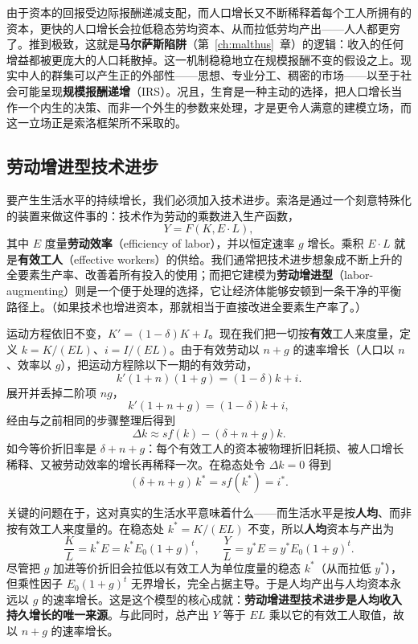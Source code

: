 \begin{remark}
由于资本的回报受边际报酬递减支配，而人口增长又不断稀释着每个工人所拥有的资本，更快的人口增长会拉低稳态劳均资本、从而拉低劳均产出——人人都更穷了。推到极致，这就是\textbf{马尔萨斯陷阱}（第~\ref{ch:malthus}~章）的逻辑：收入的任何增益都被更庞大的人口耗散掉。这一机制稳稳地立在规模报酬不变的假设之上。现实中人的群集可以产生正的外部性——思想、专业分工、稠密的市场——以至于社会可能呈现\textbf{规模报酬递增}（IRS）。况且，生育是一种主动的选择，把人口增长当作一个内生的决策、而非一个外生的参数来处理，才是更令人满意的建模立场，而这一立场正是索洛框架所不采取的。
\end{remark}

\subsection{劳动增进型技术进步}

要产生生活水平的持续增长，我们必须加入技术进步。索洛是通过一个刻意特殊化的装置来做这件事的：技术作为劳动的乘数进入生产函数，
\[
Y = F(K, E \cdot L),
\]
其中 $E$ 度量\textbf{劳动效率}（efficiency of labor），并以恒定速率 $g$ 增长。乘积 $E \cdot L$ 就是\textbf{有效工人}（effective workers）的供给。我们通常把技术进步想象成不断上升的全要素生产率、改善着所有投入的使用；而把它建模为\textbf{劳动增进型}（labor-augmenting）则是一个便于处理的选择，它让经济体能够安顿到一条干净的平衡路径上。（如果技术也增进资本，那就相当于直接改进全要素生产率了。）

运动方程依旧不变，$K' = (1-\delta)K + I$。现在我们把一切按\textbf{有效}工人来度量，定义 $k = K/(EL)$、$i = I/(EL)$。由于有效劳动以 $n + g$ 的速率增长（人口以 $n$、效率以 $g$），把运动方程除以下一期的有效劳动，
\[
k'(1+n)(1+g) = (1-\delta) k + i.
\]
展开并丢掉二阶项 $ng$，
\[
k'(1 + n + g) = (1-\delta) k + i,
\]
经由与之前相同的步骤整理后得到
\begin{equation}
\Delta k \approx s f(k) - (\delta + n + g) k.
\label{eq:solow-tech}
\end{equation}
如今等价折旧率是 $\delta + n + g$：每个有效工人的资本被物理折旧耗损、被人口增长稀释、又被劳动效率的增长再稀释一次。在稳态处令 $\Delta k = 0$ 得到
\[
(\delta + n + g)\, k^* = s f(k^*) = i^*.
\]

关键的问题在于，这对真实的生活水平意味着什么——而生活水平是按\textbf{人均}、而非按有效工人来度量的。在稳态处 $k^* = K/(EL)$ 不变，所以\textbf{人均}资本与产出为
\[
\frac{K}{L} = k^* E = k^* E_0 (1+g)^t,
\qquad
\frac{Y}{L} = y^* E = y^* E_0 (1+g)^t.
\]
尽管把 $g$ 加进等价折旧会拉低以有效工人为单位度量的稳态 $k^*$（从而拉低 $y^*$），但乘性因子 $E_0(1+g)^t$ 无界增长，完全占据主导。于是人均产出与人均资本永远以 $g$ 的速率增长。这是这个模型的核心成就：\textbf{劳动增进型技术进步是人均收入持久增长的唯一来源}。与此同时，总产出 $Y$ 等于 $EL$ 乘以它的有效工人取值，故以 $n + g$ 的速率增长。

